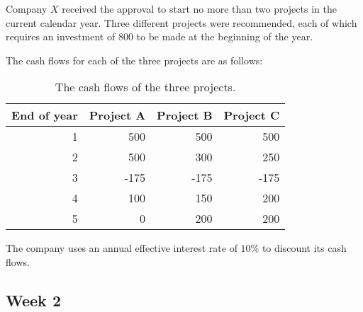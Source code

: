 \documentclass[
]{book}
\begin{document}
Company \(X\) received the approval to start no more than two projects in the current calendar year.
Three different projects were recommended, each of which requires an investment of 800 to be made at the beginning of the year.

The cash flows for each of the three projects are as follows:

\begin{table}

\caption{\label{tab:unnamed-chunk-1}The cash flows of the three projects.}
\centering
\begin{tabular}[t]{r|r|r|r}
\hline
End of year & Project A & Project B & Project C\\
\hline
1 & 500 & 500 & 500\\
\hline
2 & 500 & 300 & 250\\
\hline
3 & -175 & -175 & -175\\
\hline
4 & 100 & 150 & 200\\
\hline
5 & 0 & 200 & 200\\
\hline
\end{tabular}
\end{table}

The company uses an annual effective interest rate of \(10\%\) to discount its cash flows.

\hypertarget{week-2}{%
\subsection*{Week 2}\label{week-2}}

  
\end{document}
